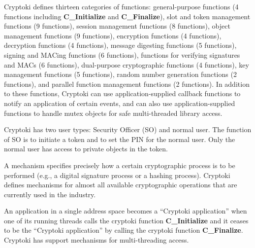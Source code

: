 \documentclass{article}
\begin{document}
Cryptoki defines thirteen categories of functions:
        general-purpose functions (4 functions including {\bf C\_Initialize}
and {\bf C\_Finalize}),
        slot and token management functions (9 functions),
        session management functions (8 functions),
        object management functions (9 functions),
        encryption functions (4 functions),
        decryption functions (4 functions),
        message digesting functions (5 functions),
        signing and MACing functions (6 functions),
        functions for verifying signatures and MACs (6 functions),
        dual-purpose cryptographic functions (4 functions),
        key management functions (5 functions),
        random number generation functions (2 functions), and
        parallel function management functions (2 functions).
In addition to these functions, Cryptoki can use 
application-supplied callback functions to notify an application 
of certain events, and can also use application-supplied functions 
to handle mutex objects for safe multi-threaded library access.

Cryptoki has two user types: Security Officer (SO) and normal user.
The function of SO is to initiate a token and to set the PIN for the normal
user. Only the normal user has access to private objects in the token.

A mechanism specifies precisely how a certain cryptographic process 
is to be performed (e.g., a digital signature process or a hashing process). 
Cryptoki defines mechanisms for almost all available cryptographic operations
that are currently used in the industry.

An application in a single address space becomes a 
``Cryptoki application'' when one of its running
threads calls the cryptoki function {\bf C\_Initialize} and it ceases to 
be the ``Cryptoki application'' by calling the 
cryptoki function {\bf C\_Finalize}. Cryptoki has support mechanisms for
multi-threading access.
\end{document}
